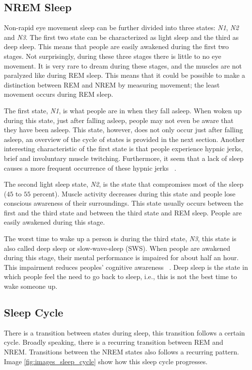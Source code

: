 \subsection{NREM Sleep} %
\label{sub:non_rem_sleep}
Non-rapid eye movement sleep can be further divided into three states: \emph{N1}, \emph{N2} and \emph{N3}. The first two state can be characterized as light sleep and the third as deep sleep. This means that people are easily awakened during the first two stages. Not surprisingly, during these three stages there is little to no eye movement. It is very rare to dream during these stages, and the muscles are not paralyzed like during REM sleep. This means that it could be possible to make a distinction between REM and NREM by measuring movement; the least movement occurs during REM sleep.

The first state, \emph{N1}, is what people are in when they fall asleep. When woken up during this state, just after falling asleep, people may not even be aware that they have been asleep. This state, however, does not only occur just after falling asleep, an overview of the cycle of states is provided in the next section. Another interesting characteristic of the first state is that people experience hypnic jerks, brief and involuntary muscle twitching. Furthermore, it seem that a lack of sleep causes a more frequent occurrence of these hypnic jerks ~\cite{Sander:1998:J-Neurol-Neurosurg-Psychiatry:9598699}.

The second light sleep state, \emph{N2}, is the state that compromises most of the sleep ($45$ to $55$ percent). Muscle activity decreases during this state and people lose conscious awareness of their surroundings. This state usually occurs between the first and the third state and between the third state and REM sleep. People are easily awakened during this stage.

The worst time to wake up a person is during the third state, \emph{N3}, this state is also called deep sleep or slow-wave-sleep (SWS). When people are awakened during this stage, their mental performance is impaired for about half an hour. This impairment reduces peoples' cognitive awareness ~\cite{Tassi2000341}.
Deep sleep is the state in which people feel the need to go back to sleep, i.e., this is not the best time to wake someone up.

\subsection{Sleep Cycle} %
\label{sub:sleep_cycle}
There is a transition between states during sleep, this transition follows a certain cycle. Broadly speaking, there is a recurring transition between REM and NREM. Transitions between the NREM states also follows a recurring pattern. Image \ref{fig:images_sleep_cycle} show how this sleep cycle progresses.

